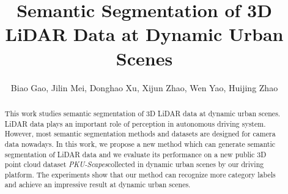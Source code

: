 





\title{Semantic Segmentation of 3D LiDAR Data at Dynamic Urban Scenes}




\author{\authorblockN
	{Biao Gao,
		Jilin Mei, 
		Donghao Xu,
		Xijun Zhao,
		Wen Yao,
		Huijing Zhao}
	}



\maketitle

\begin{abstract}
	This work studies semantic segmentation of 3D LiDAR data at dynamic urban scenes. LiDAR data plays an important role of perception in autonomous driving system. However, most semantic segmentation methods and datasets are designed for camera data nowadays. In this work, we propose a new method which can generate semantic segmentation of LiDAR data and we evaluate its performance on a new public 3D point cloud dataset \textit{PKU-Scapes}\footnotemark[1] collected in dynamic urban scenes by our driving platform. The experiments show that our method can recognize more category labels and achieve an impressive result at dynamic urban scenes.
\end{abstract}



